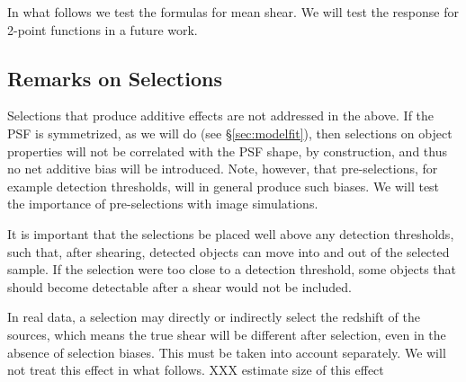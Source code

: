 \documentclass[a4paper,fleqn,usenatbib]{mnras}
\begin{document}
In what follows we test the formulas for mean shear.  We will test the
response for 2-point functions in a future work.

\subsection{Remarks on Selections}

Selections that produce additive effects are not addressed in the above.  If
the PSF is symmetrized, as we will do (see \S \ref{sec:modelfit}), then
selections on object properties will not be correlated with the PSF shape, by
construction, and thus no net additive bias will be introduced. Note, however,
that pre-selections, for example detection thresholds, will in general produce
such biases.  We will test the importance of pre-selections with image
simulations.


It is important that the selections be placed well above any detection
thresholds, such that, after shearing, detected objects can move into and out
of the selected sample.  If the selection were too close to a detection
threshold, some objects that should become detectable after
a shear would not be included.

In real data, a selection may directly or indirectly select the redshift of the
sources, which means the true shear will be different after selection, even in
the absence of selection biases.  This must be taken into account separately.
We will not treat this effect in what follows.  XXX estimate size of this
effect
\end{document}
